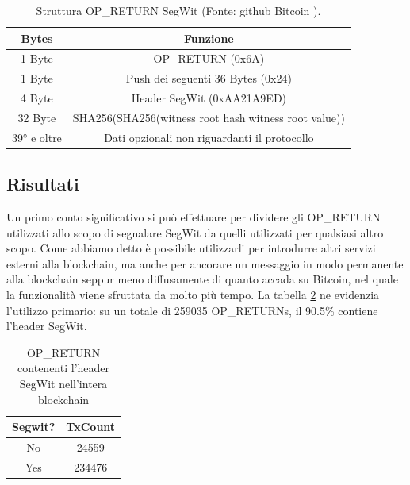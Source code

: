 \begin{table}
	\begin{tabular}{c|c}
		\textbf{Bytes} & \textbf{Funzione} \\ 
		\hline 
		1 Byte	& OP\_RETURN (0x6A) \\ 
		\hline 
		1 Byte	& Push dei seguenti 36 Bytes (0x24) \\ 
		\hline 
		4 Byte	& Header SegWit (0xAA21A9ED) \\ 
		\hline 
		32 Byte	& SHA256(SHA256(witness root hash|witness root value)) \\ 
		\hline 
		39° e oltre	&  Dati opzionali non riguardanti il protocollo\\ 
		\hline
	\end{tabular}
	\caption{Struttura OP\_RETURN SegWit (Fonte: github Bitcoin \cite{bip141}).}
	\label{seg}
\end{table} 

\subsection{Risultati}

Un primo conto significativo si può effettuare per dividere gli OP\_RETURN utilizzati allo scopo di segnalare SegWit da quelli utilizzati per qualsiasi altro scopo. Come abbiamo detto è possibile utilizzarli per introdurre altri servizi esterni alla blockchain, ma anche per ancorare un messaggio in modo permanente alla blockchain seppur meno diffusamente di quanto accada su Bitcoin, nel quale la funzionalità viene sfruttata da molto più tempo. La tabella \ref{segwityn} ne evidenzia l'utilizzo primario: su un totale di 259035 OP\_RETURNs, il 90.5\% contiene l'header SegWit.

\begin{table}
\begin{tabular}{|c|c|}
	\hline 
	\textbf{Segwit?} & \textbf{TxCount} \\ 
	\hline 
	No & 24559 \\ 
	\hline 
	Yes & 234476 \\ 
	\hline 
\end{tabular} 
\caption{OP\_RETURN contenenti l'header SegWit nell'intera blockchain}
\label{segwityn}
\end{table}

